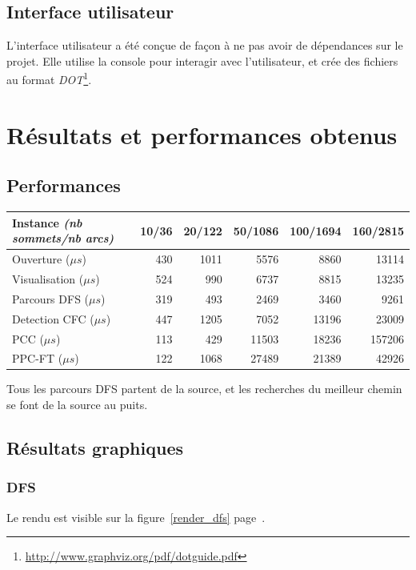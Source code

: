 \documentclass{scrreprt}
\begin{document}
	\newpage
	\section{Interface utilisateur}
	L'interface utilisateur a été conçue de façon à ne pas avoir de dépendances sur le projet. Elle utilise la console pour interagir avec l'utilisateur, et crée des fichiers au format \textit{DOT}\footnote{\url{http://www.graphviz.org/pdf/dotguide.pdf}}.
	

	\chapter{Résultats et performances obtenus}
	\section{Performances}
	\begin{center}
		\begin{tabular}{|l|r|r|r|r|r|}
			\hline
			Instance \textit{(nb sommets/nb arcs)} & 10/36 & 20/122 & 50/1086 & 100/1694 & 160/2815 \\
			\hline
			Ouverture ($\mu s$) & 430 & 1011 & 5576 & 8860 & 13114 \\
			\hline
			Visualisation ($\mu s$) & 524 & 990 & 6737 & 8815 & 13235 \\
			\hline
			Parcours DFS ($\mu s$) & 319 & 493 & 2469 & 3460 & 9261 \\
			\hline
			Detection CFC ($\mu s$) & 447 & 1205 & 7052 & 13196 & 23009 \\
			\hline
			PCC ($\mu s$) & 113 & 429 & 11503 & 18236 & 157206 \\
			\hline
			PPC-FT ($\mu s$) & 122 & 1068 & 27489 & 21389 & 42926 \\
			\hline
		\end{tabular}
	\end{center}

	Tous les parcours DFS partent de la source, et les recherches du meilleur chemin se font de la source au puits.
	
	\section{Résultats graphiques}
	\subsection{DFS}
	Le rendu est visible sur la figure~\ref{render_dfs} page~\pageref{render_dfs}.
	
\end{document}

